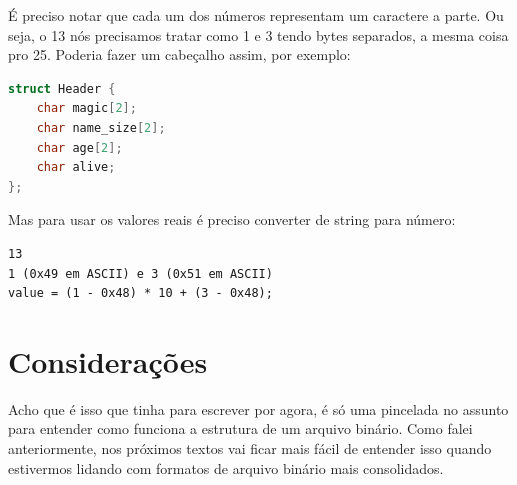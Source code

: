 \documentclass[a4paper,oneside,12pt]{article}
\begin{document}
É preciso notar que cada um dos números representam um caractere a parte. Ou seja, o 13 nós precisamos tratar como 1 e 3 tendo bytes separados, a mesma coisa pro 25. Poderia fazer um cabeçalho assim, por exemplo:

\begin{lstlisting}[language=C]
struct Header {
    char magic[2];
    char name_size[2];
    char age[2];
    char alive;
};
\end{lstlisting}

Mas para usar os valores reais é preciso converter de string para número:

\begin{lstlisting}
13
1 (0x49 em ASCII) e 3 (0x51 em ASCII)
value = (1 - 0x48) * 10 + (3 - 0x48);
\end{lstlisting}

\section{Considerações}

Acho que é isso que tinha para escrever por agora, é só uma pincelada no assunto para entender como funciona a estrutura de um arquivo binário. Como falei anteriormente, nos próximos textos vai ficar mais fácil de entender isso quando estivermos lidando com formatos de arquivo binário mais consolidados.
\end{document}

